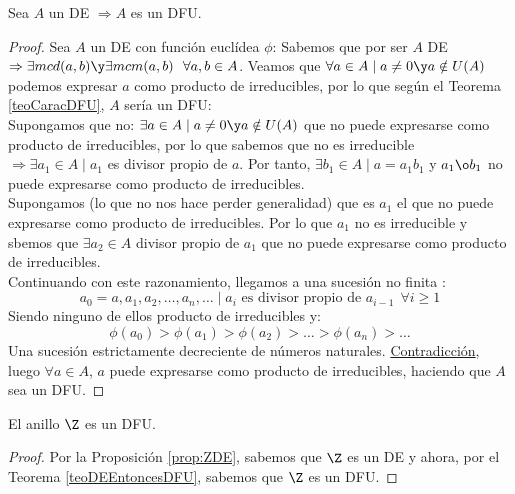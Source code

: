 \begin{teo}
    \label{teoDEEntoncesDFU}
    Sea $A$ un DE $\Rightarrow A$ es un DFU.
\begin{proof}
    Sea $A$ un DE con función euclídea $\phi$:\newline
    Sabemos que por ser $A$ DE $\Rightarrow \exists mcd(a,b) \y \exists mcm(a,b)~~\forall a,b \in A$.\newline
    Veamos que $\forall a \in A \mid a \neq 0 \y a \notin U(A)$ podemos expresar $a$ como producto de irreducibles, por lo
    que según el Teorema \ref{teoCaracDFU}, $A$ sería un DFU:\\

    
    Supongamos que no: $\exists a \in A \mid a\neq 0 \y a \notin U(A)$ que no puede expresarse como producto de irreducibles,
    por lo que sabemos que no es irreducible $\Rightarrow \exists a_1 \in A \mid a_1$ es divisor propio de $a$.\newline
    Por tanto, $\exists b_1 \in A \mid a=a_1b_1$ y $a_1 \o b_1$ no puede expresarse como producto de irreducibles.\\

    
    Supongamos (lo que no nos hace perder generalidad) que es $a_1$ el que no puede expresarse como producto de irreducibles.
    Por lo que $a_1$ no es irreducible y sbemos que $\exists a_2 \in A$ divisor propio de $a_1$ que no puede expresarse como
    producto de irreducibles.\\

    
    Continuando con este razonamiento, llegamos a una sucesión no finita :
    $$a_0 = a, a_1, a_2, \ldots, a_n, \ldots \mid a_i \mbox{ es divisor propio de } a_{i-1}~~\forall i \geq 1$$
    Siendo ninguno de ellos producto de irreducibles y:
    $$\phi(a_0) > \phi(a_1) > \phi(a_2) > \ldots > \phi(a_n) > \ldots$$
    Una sucesión estrictamente decreciente de números naturales. \underline{Contradicción}, luego $\forall a \in A$, $a$
    puede expresarse como producto de irreducibles, haciendo que $A$ sea un DFU.
\end{proof}
\end{teo}

\begin{coro}
    El anillo $\Z$ es un DFU.
\begin{proof}
    Por la Proposición \ref{prop:ZDE}, sabemos que $\Z$ es un DE y ahora, por el Teorema \ref{teoDEEntoncesDFU}, sabemos
    que $\Z$ es un DFU.
\end{proof}
\end{coro}

